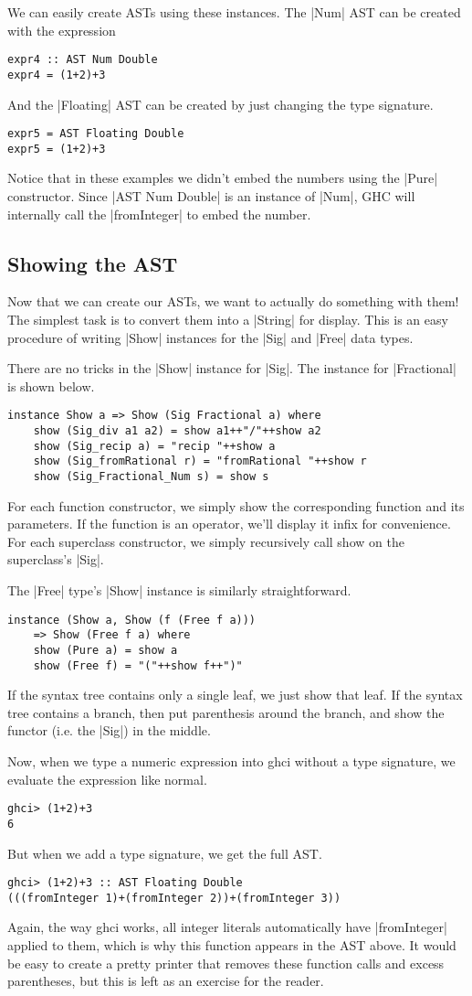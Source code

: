 \documentclass[preprint]{sigplanconf}
\theoremstyle{definition}
\begin{document}
We can easily create ASTs using these instances.
The |Num| AST can be created with the expression
\begin{lstlisting}
expr4 :: AST Num Double
expr4 = (1+2)+3
\end{lstlisting}
And the |Floating| AST can be created by just changing the type signature.
\begin{lstlisting}
expr5 = AST Floating Double
expr5 = (1+2)+3
\end{lstlisting}
Notice that in these examples we didn't embed the numbers using the |Pure| constructor.
Since |AST Num Double| is an instance of |Num|,
GHC will internally call the |fromInteger| to embed the number.

\subsection{Showing the AST}
Now that we can create our ASTs, we want to actually do something with them!
The simplest task is to convert them into a |String| for display.
This is an easy procedure of writing |Show| instances for the |Sig| and |Free| data types.

There are no tricks in the |Show| instance for |Sig|.
The instance for |Fractional| is shown below.
\begin{lstlisting}
instance Show a => Show (Sig Fractional a) where
    show (Sig_div a1 a2) = show a1++"/"++show a2
    show (Sig_recip a) = "recip "++show a
    show (Sig_fromRational r) = "fromRational "++show r
    show (Sig_Fractional_Num s) = show s
\end{lstlisting}
For each function constructor, we simply show the corresponding function and its parameters.
If the function is an operator, we'll display it infix for convenience.
For each superclass constructor, we simply recursively call show on the superclass's |Sig|.

The |Free| type's |Show| instance is similarly straightforward.
\begin{lstlisting}
instance (Show a, Show (f (Free f a)))
    => Show (Free f a) where
    show (Pure a) = show a
    show (Free f) = "("++show f++")"
\end{lstlisting}
If the syntax tree contains only a single leaf, we just show that leaf.
If the syntax tree contains a branch,
then put parenthesis around the branch,
and show the functor (i.e. the |Sig|) in the middle.

Now, when we type a numeric expression into ghci without a type signature,
we evaluate the expression like normal.
\begin{lstlisting}
ghci> (1+2)+3
6
\end{lstlisting}
But when we add a type signature,
we get the full AST.
\begin{lstlisting}
ghci> (1+2)+3 :: AST Floating Double
(((fromInteger 1)+(fromInteger 2))+(fromInteger 3))
\end{lstlisting}
Again, the way ghci works, all integer literals automatically have |fromInteger| applied to them,
which is why this function appears in the AST above.
It would be easy to create a pretty printer that removes these function calls and excess parentheses,
but this is left as an exercise for the reader.
\end{document}
